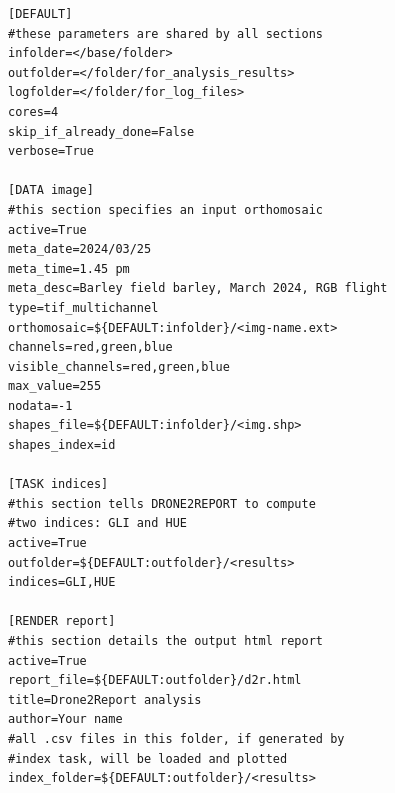 \documentclass[drones,technicalnote,accept,pdftex,moreauthors]{Definitions/mdpi}
\providecommand{\DIFaddbegin}{} %
\providecommand{\DIFdelbegin}{} %
\providecommand{\DIFdelend}{} %
\newcommand{\DIFscaledelfig}{0.5}
\newlength{\DIFdelgraphicswidth} %
\newlength{\DIFdelgraphicsheight} %
\newcommand{\DIFaddincludegraphics}[2][]{{\color{blue}\fbox{\DIFOincludegraphics[#1]{#2}}}} %
\newcommand{\DIFdelincludegraphics}[2][]{%
\sbox{\DIFdelgraphicsbox}{\DIFOincludegraphics[#1]{#2}}%
\settoboxwidth{\DIFdelgraphicswidth}{\DIFdelgraphicsbox} %
\settoboxtotalheight{\DIFdelgraphicsheight}{\DIFdelgraphicsbox} %
\scalebox{\DIFscaledelfig}{%
\parbox[b]{\DIFdelgraphicswidth}{\usebox{\DIFdelgraphicsbox}\\[-\baselineskip] \rule{\DIFdelgraphicswidth}{0em}}\llap{\resizebox{\DIFdelgraphicswidth}{\DIFdelgraphicsheight}{%
\setlength{\unitlength}{\DIFdelgraphicswidth}%
\begin{picture}(1,1)%
\thicklines\linethickness{2pt} %
{\color[rgb]{1,0,0}\put(0,0){\framebox(1,1){}}}%
{\color[rgb]{1,0,0}\put(0,0){\line( 1,1){1}}}%
{\color[rgb]{1,0,0}\put(0,1){\line(1,-1){1}}}%
\end{picture}%
}\hspace*{3pt}}} %
} %
\DeclareRobustCommand{\DIFaddbegin}{\DIFOaddbegin \let\includegraphics\DIFaddincludegraphics} %
\DeclareRobustCommand{\DIFdelbegin}{\DIFOdelbegin \let\includegraphics\DIFdelincludegraphics} %
\DeclareRobustCommand{\DIFdelend}{\DIFOaddend \let\includegraphics\DIFOincludegraphics} %
\begin{document}
\begin{minipage}{\hsize}%
\lstset{frame=single,framexleftmargin=-1pt,framexrightmargin=-17pt,framesep=12pt,linewidth=0.98\textwidth,language=bash}%
\DIFdelbegin %
\DIFdelend \DIFaddbegin \begin{lstlisting}[caption={Example of configuration file to run \textsc{drone2report}.
This takes the form of a standard .ini file, divided in sections (between
square brackets) and supporting comments (using the hash symbol)}, label={lst:config}]
[DEFAULT]
#these parameters are shared by all sections
infolder=</base/folder>
outfolder=</folder/for_analysis_results>
logfolder=</folder/for_log_files>
cores=4
skip_if_already_done=False
verbose=True

[DATA image]
#this section specifies an input orthomosaic
active=True
meta_date=2024/03/25
meta_time=1.45 pm
meta_desc=Barley field barley, March 2024, RGB flight
type=tif_multichannel
orthomosaic=${DEFAULT:infolder}/<img-name.ext>
channels=red,green,blue
visible_channels=red,green,blue
max_value=255 
nodata=-1
shapes_file=${DEFAULT:infolder}/<img.shp>
shapes_index=id

[TASK indices]
#this section tells DRONE2REPORT to compute 
#two indices: GLI and HUE
active=True
outfolder=${DEFAULT:outfolder}/<results>
indices=GLI,HUE

[RENDER report]
#this section details the output html report
active=True
report_file=${DEFAULT:outfolder}/d2r.html
title=Drone2Report analysis
author=Your name
#all .csv files in this folder, if generated by
#index task, will be loaded and plotted
index_folder=${DEFAULT:outfolder}/<results>
\end{lstlisting}
\end{minipage}
\end{document}
